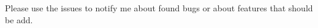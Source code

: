 
\begin{DoxyEnumerate}
\item Please use the issues to notify me about found bugs or about features that should be add. 
\end{DoxyEnumerate}